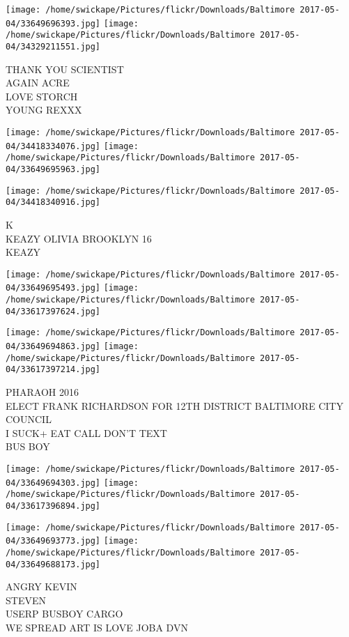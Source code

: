 \documentclass[10pt,letterpaper]{article}
\begin{document}
\texttt{[image: /home/swickape/Pictures/flickr/Downloads/Baltimore 2017-05-04/33649696393.jpg]}
\texttt{[image: /home/swickape/Pictures/flickr/Downloads/Baltimore 2017-05-04/34329211551.jpg]}

THANK YOU SCIENTIST\\
AGAIN ACRE\\
LOVE STORCH\\
YOUNG REXXX
\pagebreak

\texttt{[image: /home/swickape/Pictures/flickr/Downloads/Baltimore 2017-05-04/34418334076.jpg]}
\texttt{[image: /home/swickape/Pictures/flickr/Downloads/Baltimore 2017-05-04/33649695963.jpg]}

\vspace{0.25in}
\texttt{[image: /home/swickape/Pictures/flickr/Downloads/Baltimore 2017-05-04/34418340916.jpg]}

K\\
KEAZY OLIVIA BROOKLYN 16\\
KEAZY
\pagebreak

\texttt{[image: /home/swickape/Pictures/flickr/Downloads/Baltimore 2017-05-04/33649695493.jpg]}
\texttt{[image: /home/swickape/Pictures/flickr/Downloads/Baltimore 2017-05-04/33617397624.jpg]}

\texttt{[image: /home/swickape/Pictures/flickr/Downloads/Baltimore 2017-05-04/33649694863.jpg]}
\texttt{[image: /home/swickape/Pictures/flickr/Downloads/Baltimore 2017-05-04/33617397214.jpg]}

PHARAOH 2016\\
ELECT FRANK RICHARDSON FOR 12TH DISTRICT BALTIMORE CITY COUNCIL\\
I SUCK+ EAT CALL DON'T TEXT\\
BUS BOY
\pagebreak

\texttt{[image: /home/swickape/Pictures/flickr/Downloads/Baltimore 2017-05-04/33649694303.jpg]}
\texttt{[image: /home/swickape/Pictures/flickr/Downloads/Baltimore 2017-05-04/33617396894.jpg]}

\texttt{[image: /home/swickape/Pictures/flickr/Downloads/Baltimore 2017-05-04/33649693773.jpg]}
\texttt{[image: /home/swickape/Pictures/flickr/Downloads/Baltimore 2017-05-04/33649688173.jpg]}

ANGRY KEVIN\\
STEVEN\\
USERP BUSBOY CARGO\\
WE SPREAD ART IS LOVE JOBA DVN
\pagebreak
\end{document}
